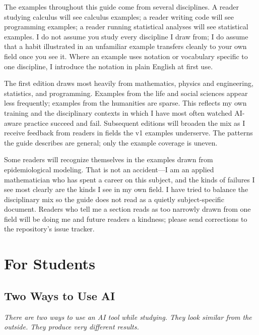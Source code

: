 \documentclass[11pt]{book}
\begin{document}
The examples throughout this guide come from several disciplines. A reader studying calculus will see calculus examples; a reader writing code will see programming examples; a reader running statistical analyses will see statistical examples. I do not assume you study every discipline I draw from; I do assume that a habit illustrated in an unfamiliar example transfers cleanly to your own field once you see it. Where an example uses notation or vocabulary specific to one discipline, I introduce the notation in plain English at first use.

The first edition draws most heavily from mathematics, physics and engineering, statistics, and programming. Examples from the life and social sciences appear less frequently; examples from the humanities are sparse. This reflects my own training and the disciplinary contexts in which I have most often watched AI-aware practice succeed and fail. Subsequent editions will broaden the mix as I receive feedback from readers in fields the v1 examples underserve. The patterns the guide describes are general; only the example coverage is uneven.

Some readers will recognize themselves in the examples drawn from epidemiological modeling. That is not an accident---I am an applied mathematician who has spent a career on this subject, and the kinds of failures I see most clearly are the kinds I see in my own field. I have tried to balance the disciplinary mix so the guide does not read as a quietly subject-specific document. Readers who tell me a section reads as too narrowly drawn from one field will be doing me and future readers a kindness; please send corrections to the repository's issue tracker.

\mainmatter

\part{For Students}

\chapter{Two Ways to Use AI}
\label{ch:two-ways}

\noindent \emph{There are two ways to use an AI tool while studying. They look similar from the outside. They produce very different results.}
\end{document}
